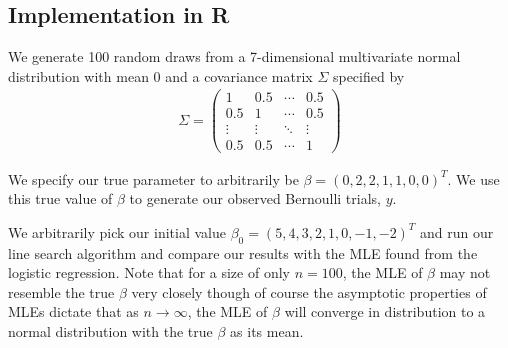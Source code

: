 \subsection{Implementation in R}

We generate 100 random draws from a 7-dimensional multivariate normal distribution with mean 0 and a covariance matrix $\Sigma$ specified by 
\begin{align*}
	\Sigma = \left(\begin{array}{cccc}
			1 	   & 0.5 	& \cdots & 0.5 \\
			0.5    & 1 		& \cdots & 0.5 \\ 
			\vdots & \vdots 	& \ddots & \vdots \\ 
			0.5 	   & 0.5 	& \cdots & 1
			\end{array}\right)
\end{align*}

We specify our true parameter to arbitrarily be $\beta = (0, 2, 2, 1, 1, 0, 0)^T$.  We use this true value of $\beta$ to generate our observed Bernoulli trials, $y$.  

We arbitrarily pick our initial value $\beta_0 = ( 5, 4, 3, 2, 1, 0, -1, -2)^T$ and run our line search algorithm  and compare our results with the MLE found from the logistic regression.
Note that for a size of only $n = 100$, the MLE of $\beta$ may not resemble the true $\beta$ very closely though of course the asymptotic properties of MLEs dictate that as $n \to \infty$, the MLE of $\beta$ will converge in distribution to a normal distribution with the true $\beta$ as its mean.  
 

